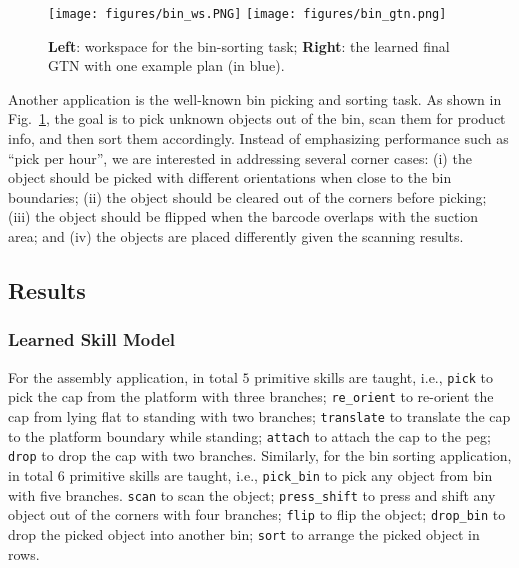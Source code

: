 \begin{figure}[t!]
    \centering
    \texttt{[image: figures/bin\_ws.PNG]}
    \texttt{[image: figures/bin\_gtn.png]}
    \caption{\textbf{Left}: workspace for the bin-sorting task; 
             \textbf{Right}: the learned final GTN with one example plan (in blue).}
    \label{fig:bin-gtn}
    \vspace{-0.15cm}
\end{figure}

Another application is the well-known bin picking and sorting task. 
As shown in Fig.~\ref{fig:bin-gtn}, the goal is to pick unknown objects out of the bin, scan them for product info, and then sort them accordingly. 
Instead of emphasizing performance such as ``pick per hour'', 
we are interested in addressing several corner cases:
(i) the object should be picked with different orientations when close to the bin boundaries;
(ii) the object should be cleared out of the corners before picking;
(iii) the object should be flipped when the barcode overlaps with the suction area;
and (iv) the objects are placed differently given the scanning results.


\subsection{Results} \label{subsec:results}

\subsubsection{Learned Skill Model}\label{subsubsec:skill-model-results}
For the assembly application, in total $5$ primitive skills are taught, i.e., 
\texttt{pick} to pick the cap from the platform with three branches;
\texttt{re\_orient} to re-orient the cap from lying flat to standing with two branches;
\texttt{translate} to translate the cap to the platform boundary while standing;
\texttt{attach} to attach the cap to the peg;
\texttt{drop} to drop the cap with two branches.
Similarly, for the bin sorting application, in total $6$ primitive skills are taught, i.e.,
\texttt{pick\_bin} to pick any object from bin with five branches. 
\texttt{scan} to scan the object; 
\texttt{press\_shift} to press and shift any object out of the corners with four branches;
\texttt{flip} to flip the object;
\texttt{drop\_bin} to drop the picked object into another bin;
\texttt{sort} to arrange the picked object in rows.



